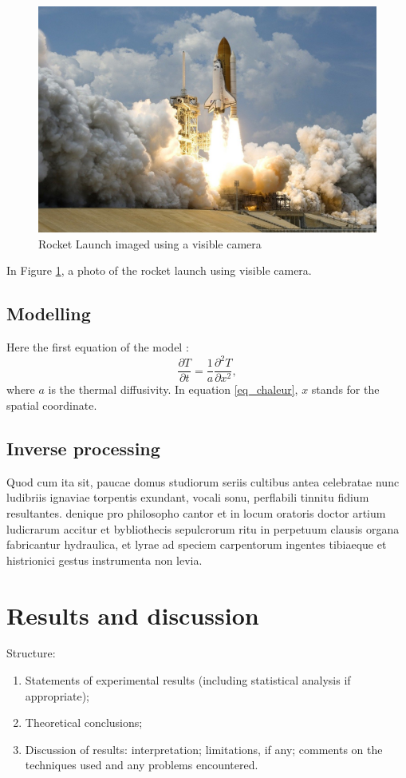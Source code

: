 \documentclass[12pt,a4paper]{article}
\begin{document}
\begin{figure}[H]
\centering
\includegraphics[scale=.2]{../figures/fig1.jpg}
\caption{Rocket Launch imaged using a visible camera}
\label{fig_rocket}
\end{figure}

In Figure \ref{fig_rocket}, a photo of the rocket launch using visible camera.

\subsection{Modelling}
Here the first equation of the model :
\begin{equation}
\frac{\partial T}{\partial t}=\frac{1}{a}\frac{\partial^2 T}{\partial x^2},
\label{eq_chaleur}
\end{equation}
where $a$ is the thermal diffusivity. In equation \ref{eq_chaleur}, $x$ stands for the spatial coordinate.

\subsection{Inverse processing}
Quod cum ita sit, paucae domus studiorum seriis cultibus antea celebratae nunc ludibriis ignaviae torpentis exundant, vocali sonu, perflabili tinnitu fidium resultantes. denique pro philosopho cantor et in locum oratoris doctor artium ludicrarum accitur et bybliothecis sepulcrorum ritu in perpetuum clausis organa fabricantur hydraulica, et lyrae ad speciem carpentorum ingentes tibiaeque et histrionici gestus instrumenta non levia.
\section{Results and discussion}
Structure:
\begin{enumerate}
\item	Statements of experimental results (including statistical analysis if appropriate); 
\item	Theoretical conclusions; 
\item	Discussion of results: interpretation; limitations, if any; comments on the techniques used and any problems encountered. 
\end{enumerate}
\end{document}
